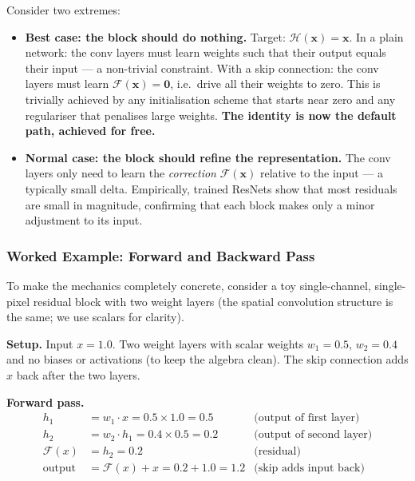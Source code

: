 \documentclass[11pt,a4paper]{article}
\begin{document}
\begin{insightbox}
Consider two extremes:
\begin{itemize}
  \item \textbf{Best case: the block should do nothing.}
    Target: $\mathcal{H}(\mathbf{x}) = \mathbf{x}$.
    In a plain network: the conv layers must learn weights such that their output equals
    their input — a non-trivial constraint.
    With a skip connection: the conv layers must learn $\mathcal{F}(\mathbf{x}) = \mathbf{0}$,
    i.e.\ drive all their weights to zero.  This is trivially achieved by any initialisation
    scheme that starts near zero and any regulariser that penalises large weights.
    \textbf{The identity is now the default path, achieved for free.}
  \item \textbf{Normal case: the block should refine the representation.}
    The conv layers only need to learn the \emph{correction} $\mathcal{F}(\mathbf{x})$
    relative to the input — a typically small delta.  Empirically, trained ResNets show
    that most residuals are small in magnitude, confirming that each block makes only a
    minor adjustment to its input.
\end{itemize}
\end{insightbox}

\subsubsection{Worked Example: Forward and Backward Pass}

To make the mechanics completely concrete, consider a toy single-channel, single-pixel
residual block with two weight layers (the spatial convolution structure is the same; we
use scalars for clarity).

\textbf{Setup.} Input $x = 1.0$.  Two weight layers with scalar weights $w_1 = 0.5$,
$w_2 = 0.4$ and no biases or activations (to keep the algebra clean).  The skip connection
adds $x$ back after the two layers.

\textbf{Forward pass.}
\begin{align*}
  h_1 &= w_1 \cdot x = 0.5 \times 1.0 = 0.5 & \text{(output of first layer)}\\
  h_2 &= w_2 \cdot h_1 = 0.4 \times 0.5 = 0.2 & \text{(output of second layer)} \\
  \mathcal{F}(x) &= h_2 = 0.2 & \text{(residual)}\\
  \text{output} &= \mathcal{F}(x) + x = 0.2 + 1.0 = \mathbf{1.2} & \text{(skip adds input back)}
\end{align*}
\end{document}
